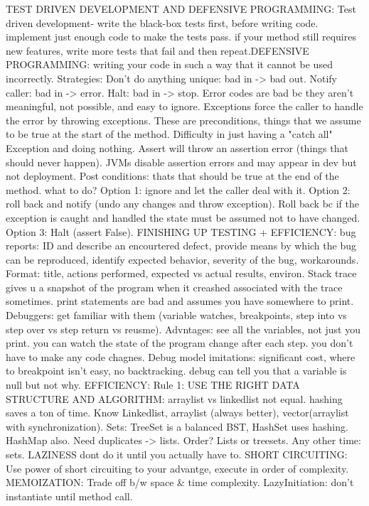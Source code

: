 \documentclass[10pt]{article}
\begin{document}
\begin{landscape}
\begin{multicols*}{6}
TEST DRIVEN DEVELOPMENT AND DEFENSIVE PROGRAMMING: Test driven development- write the black-box tests first, before writing code. implement just enough code to make the tests pass. if your method still requires new features, write more tests that fail and then repeat.DEFENSIVE PROGRAMMING: writing your code in such a way that it cannot be used incorrectly. Strategies: Don't do anything unique: bad in -> bad out. Notify caller: bad in -> error. Halt: bad in -> stop. Error codes are bad bc they aren't meaningful, not possible, and easy to ignore. Exceptions force the caller to handle the error by throwing exceptions. These are preconditions, things that we assume to be true at the start of the method. Difficulty in just having a "catch all" Exception and doing nothing. Assert will throw an assertion error (things that should never happen). JVMs disable assertion errors and may appear in dev but not deployment. Post conditions: thats that should be true at the end of the method. what to do? Option 1: ignore and let the caller deal with it. Option 2: roll back and notify (undo any changes and throw exception). Roll back bc if the exception is caught and handled the state must be assumed not to have changed. Option 3: Halt (assert False). FINISHING UP TESTING + EFFICIENCY: bug reports: ID and describe an encourtered defect, provide means by which the bug can be reproduced, identify expected behavior, severity of the bug, workarounds. Format: title, actions performed, expected vs actual results, environ. Stack trace gives u a snapshot of the program when it creashed associated with the trace sometimes. print statements are bad and assumes you have somewhere to print. Debuggers: get familiar with them (variable watches, breakpoints, step into vs step over vs step return vs reusme). Advntages: see all the variables, not just you print. you can watch the state of the program change after each step. you don't have to make any code chagnes. Debug model imitations: significant cost, where to breakpoint isn't easy, no backtracking. debug can tell you that a variable is null but not why. EFFICIENCY: Rule 1: USE THE RIGHT DATA STRUCTURE AND ALGORITHM: arraylist vs linkedlist not equal. hashing saves a ton of time. Know Linkedlist, arraylist (always better), vector(arraylist with synchronization). Sets: TreeSet is a balanced BST, HashSet uses hashing. HashMap also. Need duplicates -> lists. Order? Lists or treesets. Any other time: sets. LAZINESS dont do it until you actually have to. SHORT CIRCUITING: Use power of short circuiting to your advantge, execute in order of complexity. MEMOIZATION: Trade off b/w space \& time complexity. LazyInitiation: don't instantiate until method call.


\end{multicols*}
\end{landscape}
\end{document}
